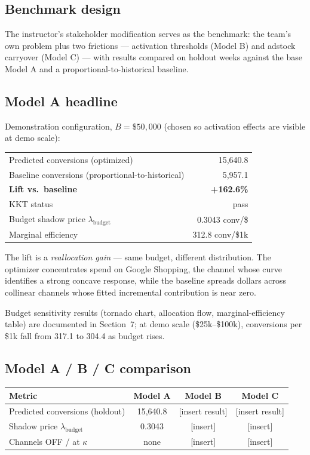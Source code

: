 \documentclass[11pt]{article}
\begin{document}
\subsection{Benchmark design}

The instructor's stakeholder modification serves as the benchmark: the team's own problem plus two frictions --- activation thresholds (Model B) and adstock carryover (Model C) --- with results compared on holdout weeks against the base Model A and a proportional-to-historical baseline.

\subsection{Model A headline}

Demonstration configuration, $B = \$50{,}000$ (chosen so activation effects are visible at demo scale):

\begin{center}
\begin{tabular}{lr}
\toprule
Predicted conversions (optimized) & 15{,}640.8 \\
Baseline conversions (proportional-to-historical) & 5{,}957.1 \\
\textbf{Lift vs.\ baseline} & \textbf{+162.6\%} \\
KKT status & pass \\
Budget shadow price $\lambda_{\text{budget}}$ & 0.3043 conv/\$ \\
Marginal efficiency & 312.8 conv/\$1k \\
\bottomrule
\end{tabular}
\end{center}

The lift is a \emph{reallocation gain} --- same budget, different distribution. The optimizer concentrates spend on Google Shopping, the channel whose curve identifies a strong concave response, while the baseline spreads dollars across collinear channels whose fitted incremental contribution is near zero.

Budget sensitivity results (tornado chart, allocation flow, marginal-efficiency table) are documented in Section~7; at demo scale (\$25k--\$100k), conversions per \$1k fall from 317.1 to 304.4 as budget rises.

\subsection{Model A / B / C comparison}

\begin{center}
\begin{tabular}{lccc}
\toprule
\textbf{Metric} & \textbf{Model A} & \textbf{Model B} & \textbf{Model C} \\
\midrule
Predicted conversions (holdout) & 15{,}640.8 & [insert result] & [insert result] \\
Shadow price $\lambda_{\text{budget}}$ & 0.3043 & [insert] & [insert] \\
Channels OFF / at $\kappa$ & none & [insert] & [insert] \\
\bottomrule
\end{tabular}
\end{center}
\end{document}
